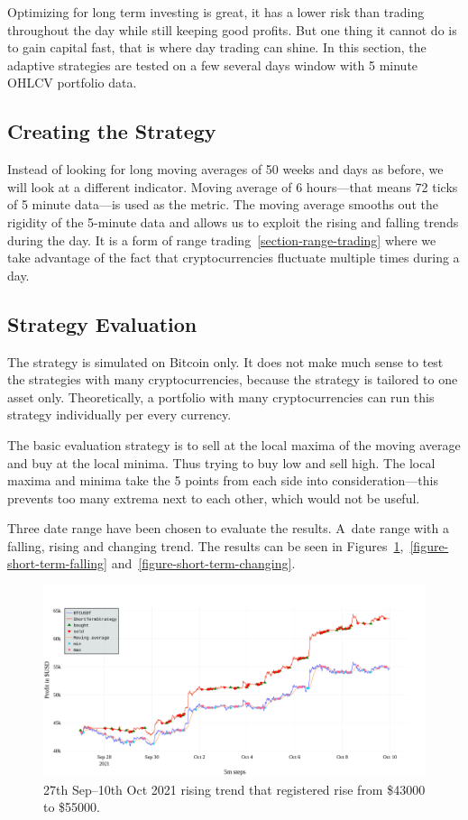 Optimizing for long term investing is great, it has a lower risk than trading throughout the day while still keeping good profits. But one thing it cannot do is to gain capital fast, that is where day trading can shine. In this section, the adaptive strategies are tested on a few several days window with 5 minute OHLCV portfolio data.

\subsection*{Creating the Strategy}
Instead of looking for long moving averages of 50 weeks and days as before, we will look at a different indicator. Moving average of 6 hours---that means 72 ticks of 5 minute data---is used as the metric. The moving average smooths out the rigidity of the 5-minute data and allows us to exploit the rising and falling trends during the day. It is a form of range trading~\ref{section-range-trading} where we take advantage of the fact that cryptocurrencies fluctuate multiple times during a day.

\subsection*{Strategy Evaluation}
The strategy is simulated on Bitcoin only. It does not make much sense to test the strategies with many cryptocurrencies, because the strategy is tailored to one asset only. Theoretically, a portfolio with many cryptocurrencies can run this strategy individually per every currency.

The basic evaluation strategy is to sell at the local maxima of the moving average and buy at the local minima. Thus trying to buy low and sell high. The local maxima and minima take the 5 points from each side into consideration---this prevents too many extrema next to each other, which would not be useful.

Three date range have been chosen to evaluate the results. A~date range with a falling, rising and changing trend. The results can be seen in Figures~\ref{figure-short-term-rising},~\ref{figure-short-term-falling} and~\ref{figure-short-term-changing}.

\begin{figure}[!hbt]
    \centering
    \includegraphics[width=\columnwidth]{figures/short-term-rising.pdf}
    \caption{27th Sep--10th Oct 2021 rising trend that registered rise from \$43000 to \$55000.}
    \label{figure-short-term-rising}
\end{figure}

